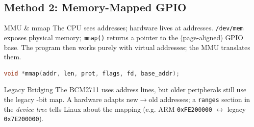 \subsection{Method 2: Memory-Mapped GPIO}


\begin{concept}{MMU \& mmap}
    The CPU sees  addresses; hardware lives at 
    addresses. \texttt{/dev/mem} exposes physical memory; \texttt{mmap()} returns a
     pointer to the (page-aligned) GPIO base. The program then
    works purely with virtual addresses; the MMU translates them.
\begin{lstlisting}[language=C, style=basesmol, aboveskip=2pt, belowskip=2pt]
void *mmap(addr, len, prot, flags, fd, base_addr);
\end{lstlisting}
\end{concept}

\begin{corollary}{Legacy Bridging}
    The BCM2711 uses  address lines, but older peripherals still use
    the legacy -bit map. A hardware  adapts new$\to$old
    addresses; a \texttt{ranges} section in the \emph{device tree} tells Linux about
    the mapping (e.g. ARM \texttt{0xFE200000} $\leftrightarrow$ legacy \texttt{0x7E200000}).
\end{corollary}

